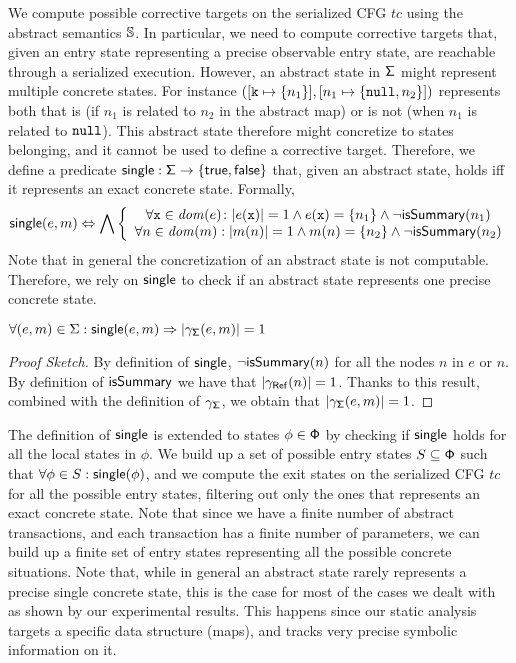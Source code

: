 We compute possible corrective targets on the serialized CFG $tc$ using the abstract semantics $\mathbb{S}$. In particular, we need to compute corrective targets that, given an entry state representing a precise observable entry state, are reachable through a serialized execution. 
%
However, an abstract state in $\mathsf{\Sigma}$ might represent multiple concrete states. For instance $([\mathtt{k} \mapsto \{n_1\}], [n_1 \mapsto \{\mathtt{null}, n_2\}])$ represents both that   is (if $n_1$ is related to $n_2$ in the abstract map) or is not (when $n_1$ is related to $\mathtt{null}$). This abstract state therefore might concretize to states belonging, and it cannot be used to define a corrective target.
%
Therefore, we define a predicate $\mathsf{single} : \mathsf{\Sigma} \to \{\mathsf{true}, \mathsf{false}\}$ that, given an abstract state, holds iff it represents an exact concrete state. Formally,
\[
\mathsf{single}(e, m)
\Leftrightarrow
 \bigwedge \left\{ \begin{array}{c}
	 \forall \mathtt{x} \in \mathit{dom}(e) \colon |e(\mathtt{x})|=1 \land e(\mathtt{x})=\{n_1\} \land \neg \mathsf{isSummary}(n_1) \\
	\forall n \in \mathit{dom}(m) : |m(n)|=1 \land m(n)=\{n_2\} \land \neg \mathsf{isSummary}(n_2)
\end{array} \right.\]
Note that in general the concretization of an abstract state is not computable. Therefore, we rely on $\mathsf{single}$ to check if an abstract state represents one precise concrete state.

\begin{lemma}
	\label{lemma:singleconcretization}
	$\forall (e, m) \in \Sigma : \mathsf{single}(e, m) \Rightarrow |\gamma_{\mathsf{\Sigma}}(e, m)|=1$
\begin{proof}[Proof Sketch]
 By definition of $\mathsf{single}$, $\neg \mathsf{isSummary}(n)$ for all the nodes $n$ in $e$ or $n$. By definition of $\mathsf{isSummary}$ we have that $|\gamma_{\mathsf{Ref}}(n)|=1$. Thanks to this result, combined with the definition of $\gamma_{\mathsf{\Sigma}}$, we obtain that $|\gamma_{\mathsf{\Sigma}}(e, m)|=1$.
\end{proof}
\end{lemma}

The definition of $\mathsf{single}$ is extended to states $\phi \in \mathsf{\mathsf{\Phi}}$ by checking if $\mathsf{single}$ holds for all the local states in $\phi$. 
We build up a set of possible entry states $S \subseteq \mathsf{\mathsf{\Phi}}$ such that $\forall \phi \in S : \mathsf{single}(\phi)$, and we compute the exit states on the serialized CFG $tc$ for all the possible entry states, filtering out only the ones that represents an exact concrete state. Note that since we have a finite number of abstract transactions, and each transaction has a finite number of parameters, we can build up a finite set of entry states representing all the possible concrete situations. Note that, while in general an abstract state rarely represents a precise single concrete state, this is the case for most of the cases we dealt with as shown by our experimental results. This happens since our static analysis targets a specific data structure (maps), and tracks very precise symbolic information on it.

